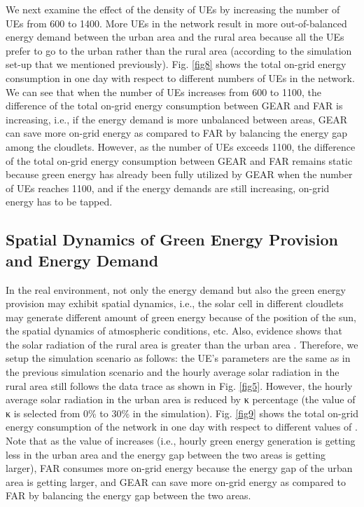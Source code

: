 \documentclass[journal,12pt,draftclsnofoot,onecolumn]{IEEEtran}
\begin{document}
\begin{titlepage}
\begin{center}
We next examine the effect of the density of UEs by increasing the number of UEs from 600 to 1400. More UEs in the network result in more out-of-balanced energy demand between the urban area and the rural area because all the UEs prefer to go to the urban rather than the rural area (according to the simulation set-up that we mentioned previously). Fig. \ref{fig8} shows the total on-grid energy consumption in one day with respect to different numbers of UEs in the network. We can see that when the number of UEs increases from 600 to 1100, the difference of the total on-grid energy consumption between GEAR and FAR is increasing, i.e., if the energy demand is more unbalanced between areas, GEAR can save more on-grid energy as compared to FAR by balancing the energy gap among the cloudlets. However, as the number of UEs exceeds 1100, the difference of the total on-grid energy consumption between GEAR and FAR remains static because green energy has already been fully utilized by GEAR when the number of UEs reaches 1100, and if the energy demands are still increasing, on-grid energy has to be tapped.\

\subsection{Spatial Dynamics of Green Energy Provision and Energy Demand}
In the real environment, not only the energy demand but also the green energy provision may exhibit spatial dynamics, i.e., the solar cell in different cloudlets may generate different amount of green energy because of the position of the sun, the spatial dynamics of atmospheric conditions, etc. Also, evidence shows that the solar radiation of the rural area is greater than the urban area \cite{28}. Therefore, we setup the simulation scenario as follows: the UE's parameters are the same as in the previous simulation scenario and the hourly average solar radiation in the rural area still follows the data trace as shown in Fig. \ref{fig5}. However, the hourly average solar radiation in the urban area is reduced by κ percentage (the value of κ is selected from 0\% to 30\% in the simulation). Fig. \ref{fig9} shows the total on-grid energy consumption of the network in one day with respect to different values of . Note that as the value of  increases (i.e., hourly green energy generation is getting less in the urban area and the energy gap between the two areas is getting larger), FAR consumes more on-grid energy because the energy gap of the urban area is getting larger, and GEAR can save more on-grid energy as compared to FAR by balancing the energy gap between the two areas.
	

\end{center}
\end{titlepage}
\end{document}
